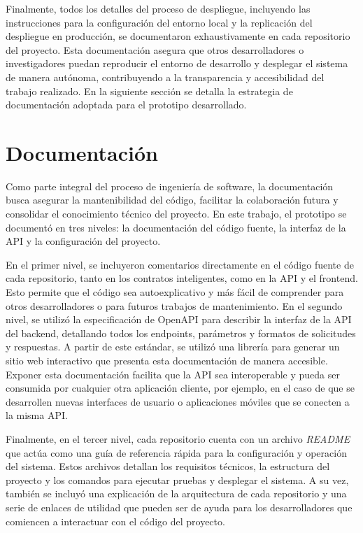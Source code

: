 Finalmente, todos los detalles del proceso de despliegue, incluyendo las instrucciones para la configuración del entorno local y la replicación del despliegue en producción, se documentaron exhaustivamente en cada repositorio del proyecto. Esta documentación asegura que otros desarrolladores o investigadores puedan reproducir el entorno de desarrollo y desplegar el sistema de manera autónoma, contribuyendo a la transparencia y accesibilidad del trabajo realizado. En la siguiente sección se detalla la estrategia de documentación adoptada para el prototipo desarrollado.

\section{Documentación}
\label{sec:documentation}

Como parte integral del proceso de ingeniería de software, la documentación busca asegurar la mantenibilidad del código, facilitar la colaboración futura y consolidar el conocimiento técnico del proyecto. En este trabajo, el prototipo se documentó en tres niveles: la documentación del código fuente, la interfaz de la API y la configuración del proyecto.

En el primer nivel, se incluyeron comentarios directamente en el código fuente de cada repositorio, tanto en los contratos inteligentes, como en la API y el frontend. Esto permite que el código sea autoexplicativo y más fácil de comprender para otros desarrolladores o para futuros trabajos de mantenimiento. En el segundo nivel, se utilizó la especificación de OpenAPI para describir la interfaz de la API del backend, detallando todos los endpoints, parámetros y formatos de solicitudes y respuestas. A partir de este estándar, se utilizó una librería para generar un sitio web interactivo que presenta esta documentación de manera accesible. Exponer esta documentación facilita que la API sea interoperable y pueda ser consumida por cualquier otra aplicación cliente, por ejemplo, en el caso de que se desarrollen nuevas interfaces de usuario o aplicaciones móviles que se conecten a la misma API.

Finalmente, en el tercer nivel, cada repositorio cuenta con un archivo \textit{README} que actúa como una guía de referencia rápida para la configuración y operación del sistema. Estos archivos detallan los requisitos técnicos, la estructura del proyecto y los comandos para ejecutar pruebas y desplegar el sistema. A su vez, también se incluyó una explicación de la arquitectura de cada repositorio y una serie de enlaces de utilidad que pueden ser de ayuda para los desarrolladores que comiencen a interactuar con el código del proyecto.

